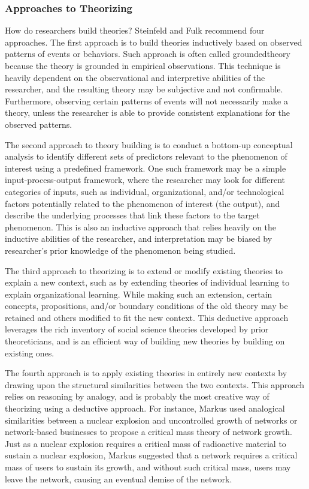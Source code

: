 \subsubsection{Approaches to Theorizing}

How do researchers build theories? Steinfeld and Fulk\cite{steinfield1990theory} recommend four approaches. The first approach is to build theories inductively based on observed patterns of events or behaviors. Such approach is often called \gls{groundedtheory} because the theory is grounded in empirical observations. This technique is heavily dependent on the observational and interpretive abilities of the researcher, and the resulting theory may be subjective and not confirmable. Furthermore, observing certain patterns of events will not necessarily make a theory, unless the researcher is able to provide consistent explanations for the observed patterns. 

The second approach to theory building is to conduct a bottom-up conceptual analysis to identify different sets of predictors relevant to the phenomenon of interest using a predefined framework. One such framework may be a simple input-process-output framework, where the researcher may look for different categories of inputs, such as individual, organizational, and/or technological factors potentially related to the phenomenon of interest (the output), and describe the underlying processes that link these factors to the target phenomenon. This is also an inductive approach that relies heavily on the inductive abilities of the researcher, and interpretation may be biased by researcher's prior knowledge of the phenomenon being studied.

The third approach to theorizing is to extend or modify existing theories to explain a new context, such as by extending theories of individual learning to explain organizational learning. While making such an extension, certain concepts, propositions, and/or boundary conditions of the old theory may be retained and others modified to fit the new context. This deductive approach leverages the rich inventory of social science theories developed by prior theoreticians, and is an efficient way of building new theories by building on existing ones.

The fourth approach is to apply existing theories in entirely new contexts by drawing upon the structural similarities between the two contexts. This approach relies on reasoning by analogy, and is probably the most creative way of theorizing using a deductive approach. For instance, Markus\cite{markus1987toward} used analogical similarities between a nuclear explosion and uncontrolled growth of networks or network-based businesses to propose a critical mass theory of network growth. Just as a nuclear explosion requires a critical mass of radioactive material to sustain a nuclear explosion, Markus suggested that a network requires a critical mass of users to sustain its growth, and without such critical mass, users may leave the network, causing an eventual demise of the network.

